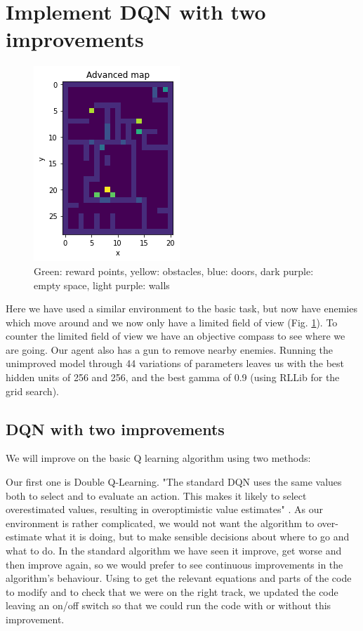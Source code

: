\documentclass[a4pape, 11pt, english]{article}
\begin{document}
\section{Implement DQN with two improvements}
\begin{figure}[h!]
	\begin{center}
		\includegraphics{img/advanced_map.png}
		\caption{Green: reward points, yellow: obstacles, blue: doors, dark purple: empty space, light purple: walls}
		\label{fig:advanced_map}
	\end{center}
\end{figure}

Here we have used a similar environment to the basic task, but now have enemies which move around and we now only have a limited field of view (Fig. \ref{fig:advanced_map}). To counter the limited field of view we have an objective compass to see where we are going. Our agent also has a gun to remove nearby enemies. Running the unimproved model through 44 variations of parameters leaves us with the best hidden units of 256 and 256, and the best gamma of 0.9 (using RLLib for the grid search).

\subsection{DQN with two improvements}
We will improve on the basic Q learning algorithm using two methods:

Our first one is Double Q-Learning. "The standard DQN uses the same values both to select and to evaluate an action. This makes it likely to select overestimated values, resulting in overoptimistic value estimates" \citep[p. 2]{van_hasselt_deep_2016}. As our environment is rather complicated, we would not want the algorithm to over-estimate what it is doing, but to make sensible decisions about where to go and what to do. In the standard algorithm we have seen it improve, get worse and then improve again, so we would prefer to see continuous improvements in the algorithm's behaviour. Using \citep[p. 2, 4]{van_hasselt_deep_2016} to get the relevant equations and parts of the code to modify and \citep{hennis_double_2019} to check that we were on the right track, we updated the code leaving an on/off switch so that we could run the code with or without this improvement.
\end{document}
